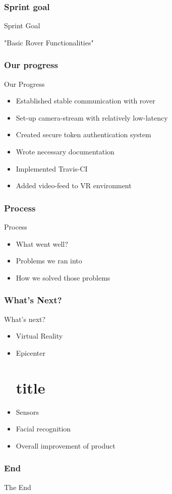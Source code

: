 \documentclass{beamer}
\begin{document}
\section{Sprint goal}
\begin{frame}{Sprint Goal}
\Huge{\centerline{"Basic Rover Functionalities"}}
\end{frame}

\section{Our progress}
\begin{frame}{Our Progress}
    \begin{itemize}
    \item Established stable communication with rover
    \item Set-up camera-stream with relatively low-latency
    \item Created secure token authentication system
    \item Wrote necessary documentation
    \item Implemented Travis-CI 
    \item Added video-feed to VR environment
\end{itemize}
\end{frame}

\section{Process}
\begin{frame}{Process}
    \begin{itemize}
        \item What went well?
        \item Problems we ran into
        \item How we solved those problems
    \end{itemize}
\end{frame}

\section{What's Next? }
\begin{frame}{What's next?}
    \begin{itemize}
        \item Virtual Reality
        \item Epicenter\part{title}
        \item Sensors
        \item Facial recognition
        \item Overall improvement of product
    \end{itemize}
\end{frame}

\section{End}
\begin{frame}
\Huge{\centerline{The End}}
\end{frame}
\end{document}
